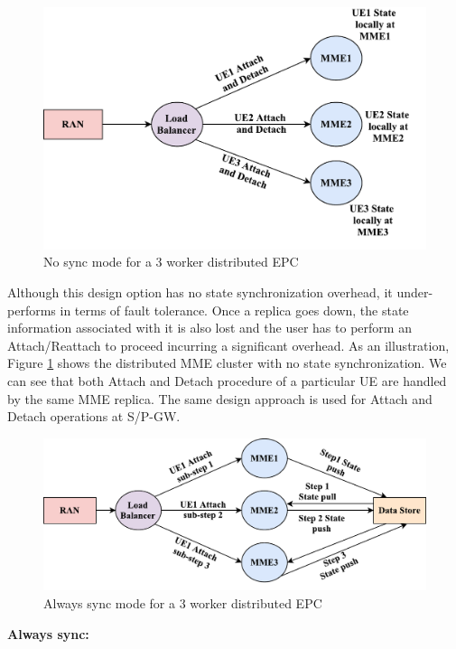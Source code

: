 \documentclass[hidelinks]{report}
\begin{document}
\begin{figure}[H]
\centering
\includegraphics[scale=0.45]{images/stateful.pdf}
\caption{No sync mode for a 3 worker distributed EPC}
\label{fig:nosync}
\end{figure}
 Although this design option has no state synchronization overhead, it under-performs in terms of fault tolerance. Once a replica goes down, the state information associated with it is also lost and the user has to perform an Attach/Reattach to proceed incurring a significant overhead. As an illustration, Figure \ref{fig:nosync} shows the distributed MME cluster with no state synchronization. We can see that both Attach and Detach procedure of a particular UE are handled by the same MME replica. The same design approach is used for Attach and Detach operations at S/P-GW. 
 
 
\begin{figure}[H]
\centering
\includegraphics[scale=0.45]{images/stateless.pdf}
\caption{Always sync mode for a 3 worker distributed EPC}
\label{fig:alsync}
\end{figure}
\noindent\textbf{Always sync:}
\end{document}
